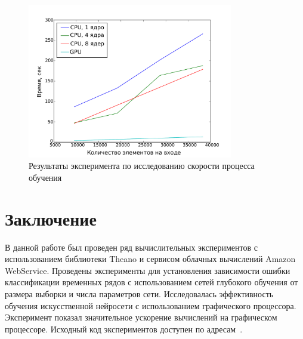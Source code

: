 \documentclass[12pt]{article}
\begin{document}
\begin{figure}[tb!]
 \centering
  \includegraphics[width=0.8\textwidth]{result.pdf}
 \caption{Результаты эксперимента по исследованию скорости процесса обучения}
 \label{fig:speed}
\end{figure}

\section{Заключение}
В данной работе был проведен ряд вычислительных экспериментов с использованием библиотеки Theano и сервисом облачных вычислений Amazon WebService. Проведены эксперименты для установления зависимости ошибки классификации временных рядов с использованием сетей глубокого обучения от размера выборки и числа параметров сети. Исследовалась эффективность обучения искусственной нейросети с использованием графического процессора. Эксперимент показал значительное ускорение вычислений на графическом процессоре. Исходный код экспериментов доступен по адресам~\cite{svn,source_popova}.
\end{document}
